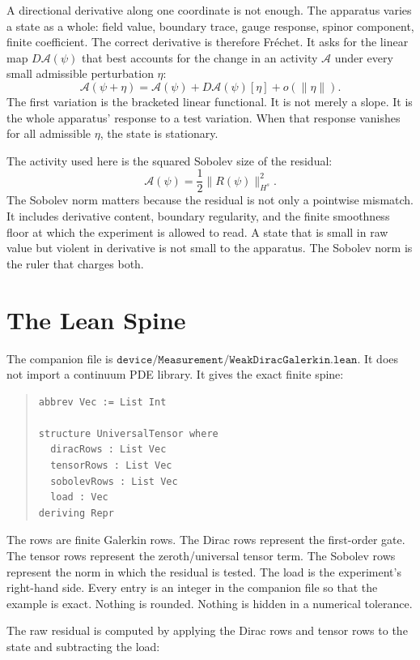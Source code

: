 A directional derivative along one coordinate is not enough. The apparatus varies a state as a whole: field
value, boundary trace, gauge response, spinor component, finite coefficient. The correct derivative is therefore
Fréchet. It asks for the linear map \(D\mathcal A(\psi)\) that best accounts for the change in an activity
\(\mathcal A\) under every small admissible perturbation \(\eta\):
\[
  \mathcal A(\psi+\eta)
  =
  \mathcal A(\psi)
  + D\mathcal A(\psi)[\eta]
  + o(\|\eta\|).
\]
The first variation is the bracketed linear functional. It is not merely a slope. It is the whole apparatus'
response to a test variation. When that response vanishes for all admissible \(\eta\), the state is stationary.

The activity used here is the squared Sobolev size of the residual:
\[
  \mathcal A(\psi) = \frac12\|R(\psi)\|_{H^s}^{2}.
\]
The Sobolev norm matters because the residual is not only a pointwise mismatch. It includes derivative content,
boundary regularity, and the finite smoothness floor at which the experiment is allowed to read. A state that is
small in raw value but violent in derivative is not small to the apparatus. The Sobolev norm is the ruler that
charges both.

\section{The Lean Spine}

The companion file is \(\texttt{device/Measurement/WeakDiracGalerkin.lean}\). It does not import a continuum PDE
library. It gives the exact finite spine:

\begin{quote}\small
\begin{verbatim}
abbrev Vec := List Int

structure UniversalTensor where
  diracRows : List Vec
  tensorRows : List Vec
  sobolevRows : List Vec
  load : Vec
deriving Repr
\end{verbatim}
\end{quote}

The rows are finite Galerkin rows. The Dirac rows represent the first-order gate. The tensor rows represent the
zeroth/universal tensor term. The Sobolev rows represent the norm in which the residual is tested. The load is
the experiment's right-hand side. Every entry is an integer in the companion file so that the example is exact.
Nothing is rounded. Nothing is hidden in a numerical tolerance.

The raw residual is computed by applying the Dirac rows and tensor rows to the state and subtracting the load:

